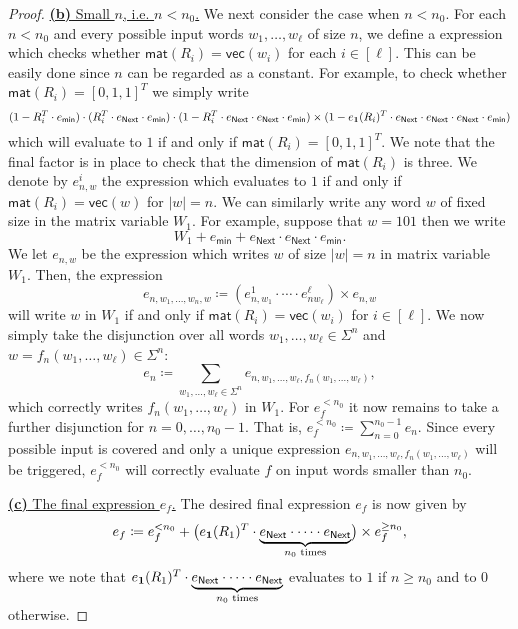 \begin{proof}
\medskip
\noindent
\underline{\textbf{(b)} Small $n$, i.e. $n< n_0$.}	
We next consider the case when $n<n_0$. For each $n<n_0$ and every possible input words
    $w_1,\ldots,w_\ell$ of size $n$, we define a \langfor expression which checks whether
    $\mathsf{mat}(R_i)=\mathsf{vec}(w_i)$ for each $i\in[\ell]$. This can be easily done since $n$ 
    can be regarded as a constant. For example, to check whether $\mathsf{mat}(R_i)=[0,1,1]^T$ we simply write
    $$
    (1- R_i^T\cdot e_{\mathsf{min}})\cdot (R_i^T\cdot e_{\mathsf{Next}}\cdot e_{\mathsf{min}})\cdot (1- R_i^T\cdot e_{\mathsf{Next}}\cdot e_{\mathsf{Next}}\cdot e_{\mathsf{min}})\times (1- e_{\mathbf{1}}(R_i)^T\cdot e_{\mathsf{Next}}\cdot e_{\mathsf{Next}}\cdot e_{\mathsf{Next}}\cdot e_{\mathsf{min}})
    $$
    which will evaluate to $1$ if and only if $\mathsf{mat}(R_i)=[0,1,1]^T$. We note that the final factor is in 
    place to check that the dimension of $\mathsf{mat}(R_i)$ is three.
    We denote by
    $e_{n,w}^i$ the expression which evaluates to $1$ if and only if $\mathsf{mat}(R_i)=\mathsf{vec}(w)$
    for $|w|=n$.
    We can similarly
    write any word $w$ of fixed size in the matrix variable $W_1$. For example, suppose that $w=101$
    then we write 
    $$
    W_1+ e_{\mathsf{min}}+  e_{\mathsf{Next}}\cdot e_{\mathsf{Next}}\cdot e_{\mathsf{min}}.
    $$
    We let $e_{n,w}$ be the expression which writes $w$ of size $|w|=n$ in matrix variable $W_1$.
    Then, the expression
    $$
    e_{n,w_1,\ldots,w_n,w}\coloneqq (e_{n,w_1}^1\cdot\cdots\cdot e_{nw_{\ell}}^\ell)\times e_{n,w}
    $$
    will write $w$ in $W_1$ if and only if $\mathsf{mat}(R_i)=\mathsf{vec}(w_i)$ for $i\in[\ell]$.
    We now simply take the disjunction over all words 
    $w_1,\ldots,w_\ell\in\Sigma^n$ and $w=f_n(w_1,\ldots,w_\ell)\in\Sigma^n$:
    $$
    e_n\coloneqq \sum_{w_1,\ldots,w_\ell\in\Sigma^n} e_{n,w_1,\ldots,w_\ell,f_n(w_1,\ldots,w_\ell)},
    $$
    which correctly writes $f_n(w_1,\ldots,w_\ell)$ in $W_1$. For $e_f^{<n_0}$ it now remains
to take a further disjunction for $n=0,\ldots, n_0-1$. That is,
    $
    e_f^{<n_0}\coloneqq \sum_{n=0}^{n_0-1} e_n
    $.
    Since every possible input is covered and only a unique expression 
    $e_{n,w_1,\ldots,w_\ell,f_n(w_1,\ldots,w_\ell)}$ will be triggered, $e_f^{<n_0}$ will correctly
    evaluate $f$ on input words smaller than $n_0$.

\medskip
\noindent
\underline{\textbf{(c)} The final expression $e_f$.}	
 The desired final expression $e_f$ is now given by
    $$
    e_f\coloneqq e_f^{<n_0} + \bigl(e_{\mathbf{1}}(R_1)^T\cdot\underbrace{e_{\mathsf{Next}}\cdot\cdots\cdot e_{\mathsf{Next}}}_{\text{$n_0$ times}}\bigr)\times e_f^{\geq n_0},
    $$
where we note that $e_{\mathbf{1}}(R_1)^T\cdot\underbrace{e_{\mathsf{Next}}\cdot\cdots\cdot e_{\mathsf{Next}}}_{\text{$n_0$ times}}$ evaluates to $1$ if
$n\geq n_0$ and to $0$ otherwise.
\end{proof}


